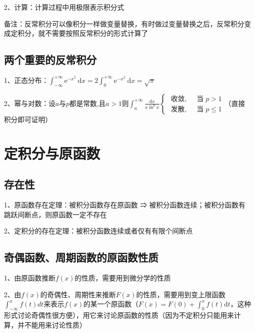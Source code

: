 2、计算：计算过程中用极限表示积分式

备注：反常积分可以像积分一样做变量替换，有时做过变量替换之后，反常积分变成定积分，就不需要按照反常积分的形式计算了



\subsection{两个重要的反常积分}

1、正态分布：$ \int_{-\infty}^{+\infty} \mathrm{e}^{-x^{2}} \mathrm{~d} x=2 \int_{0}^{+\infty} \mathrm{e}^{-x^{2}} \mathrm{~d} x=\sqrt{\pi} $

2、幂与对数：设$ a $与$ p $都是常数,且$ a>1 $则$ \int_{a}^{+\infty} \frac{\mathrm{d} x}{x \ln ^{p} x} \begin{cases}\text { 收敛, } & \text { 当 } p>1 \\ \text { 发散, } & \text { 当 } p \leqslant 1\end{cases} $（直接积分即可证明）

\section{定积分与原函数}



\subsection{存在性}

1、原函数存在定理：被积分函数存在原函数 ⇒ 被积分函数连续；被积分函数有跳跃间断点，则原函数一定不存在

2、定积分的存在定理：被积分函数连续或者仅有有限个间断点



\subsection{奇偶函数、周期函数的原函数性质}

1、由原函数推断$ f(x) $的性质，需要用到微分学的性质

2、由$ f(x) $的奇偶性、周期性来推断$ F(x) $的性质，需要用到变上限函数$ \int_{-\infty}^{x}f(t)dt $来表示$ f(x) $的某一个原函数（$ F(x)=F(0)+\int_{0}^{x} f(t) \mathrm{d} t $，这种形式讨论奇偶性很方便），用它来讨论原函数的性质（因为不定积分只能用来计算，并不能用来讨论性质）


